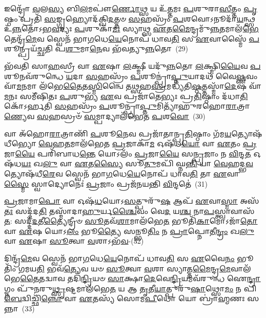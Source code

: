 𑌇𑌨𑍍𑌦𑍍𑌰𑍋᳴ \ul{𑌵}\-𑌲\-\ul{𑌸𑍍𑌯} 𑌬𑌿\-\ul{𑌲}\-𑌮𑌪𑍗॑\-\ul{𑌰𑍍𑌣𑍋}\-𑌥𑍍𑌸 𑌯 𑌉᳴\-\ul{𑌤𑍍𑌤}\-𑌮𑌃 \ul{𑌪}\-𑌶𑍁𑌰𑌾\-\ul{𑌸𑍀}\-𑌤𑍍𑌤𑌂 \ul{𑌪𑍃}\-𑌷𑍍𑌠𑌂 𑌪𑍍𑌰𑌤𑌿᳴ \ul{𑌸}\-𑌙𑍍𑌗𑍃𑌹𑍍𑌯𑍋𑌦᳴𑌕𑍍𑌖𑌿\-\ul{𑌦}\-𑌤𑍍𑌤𑍞 \ul{𑌸}\-𑌹𑌸𑍍𑌰𑌂᳴ \ul{𑌪}\-𑌶𑌵𑍋\-𑌽𑌨𑍂𑌦𑌾᳴\-\ul{𑌯}\-𑌨𑍍𑌥𑍍𑌸 𑌉᳴\-\ul{𑌨𑍍𑌨}\-𑌤𑍋᳴\-𑌽𑌭\-\ul{𑌵}\-𑌦𑍍𑌯𑌃 \ul{𑌪}\-𑌶𑍁𑌕𑌾᳴\-\ul{𑌮𑌃} 𑌸𑍍𑌯𑌾𑌥𑍍𑌸 \ul{𑌏}\-𑌤\-\ul{𑌮𑍈}\-𑌨𑍍𑌦𑍍𑌰𑌮𑍁᳴\-\ul{𑌨𑍍𑌨}\-𑌤𑌮𑌾𑌲᳴\-\ul{𑌭𑍇}\-𑌤𑍇𑌨𑍍𑌦𑍍𑌰᳴\-\ul{𑌮𑍇}\-𑌵 𑌸𑍍𑌵𑍇𑌨᳴ 𑌭𑌾\-\ul{𑌗}\-𑌧𑍇\-\ul{𑌯𑍇}\-𑌨𑍋𑌪᳴ 𑌧𑌾𑌵\-\ul{𑌤𑌿} 𑌸 \ul{𑌏}\-𑌵𑌾𑌸𑍍𑌮𑍈᳴ \ul{𑌪}\-𑌶𑍂𑌨𑍍𑌪𑍍𑌰𑌯᳴𑌚𑍍𑌛𑌤𑌿 𑌪\-\ul{𑌶𑍁}\-𑌮𑌾\-\ul{𑌨𑍇}\-𑌵 𑌭᳴𑌵𑌤𑍍𑌯𑍁\-\ul{𑌨𑍍𑌨}\-𑌤𑍋~(29)

𑌭᳴𑌵𑌤𑌿 𑌸𑌾\-\ul{𑌹}\-𑌸𑍍𑌰𑍀 𑌵𑌾 \ul{𑌏}\-𑌷𑌾 \ul{𑌲}\-𑌕𑍍𑌷𑍍𑌮𑍀 𑌯𑌦𑍁᳴\-\ul{𑌨𑍍𑌨}\-𑌤𑍋 \ul{𑌲}\-𑌕𑍍𑌷𑍍𑌮𑌿\-\ul{𑌯𑍈}\-𑌵 \ul{𑌪}\-𑌶𑍂𑌨𑌵᳴\-𑌰𑍁𑌨𑍍𑌧𑍇 \ul{𑌯}\-𑌦𑌾 \ul{𑌸}\-𑌹𑌸𑍍𑌰𑌂᳴ \ul{𑌪}\-𑌶𑍂𑌨𑍍𑌪𑍍𑌰𑌾॑\-\ul{𑌪𑍍𑌨𑍁}\-𑌯𑌾𑌦𑌥᳴ 𑌵𑍈\-\ul{𑌷𑍍𑌣}\-𑌵𑌂 𑌵𑌾᳴\-\ul{𑌮}\-𑌨𑌮𑌾 𑌲᳴𑌭𑍇\-\ul{𑌤𑍈}\-𑌤\-\ul{𑌸𑍍𑌮𑌿}\-𑌨𑍍𑌵𑍈 𑌤\-\ul{𑌥𑍍𑌸}\-𑌹\-\ul{𑌸𑍍𑌰}\-𑌮𑌦𑍍𑌧𑍍𑌯᳴𑌤𑌿\-\ul{𑌷𑍍𑌠}\-𑌤𑍍𑌤𑌸𑍍𑌮𑌾᳴\-\ul{𑌦𑍇}\-𑌷 𑌵𑌾᳴\-\ul{𑌮}\-𑌨𑌃 𑌸𑌮𑍀᳴𑌷𑌿𑌤𑌃 \ul{𑌪}\-𑌶𑍁𑌭𑍍𑌯᳴ \ul{𑌏}\-𑌵 𑌪𑍍𑌰𑌜𑌾᳴𑌤𑍇𑌭𑍍𑌯𑌃 𑌪𑍍𑌰\-\ul{𑌤𑌿}\-𑌷𑍍𑌠𑌾𑌂 𑌦᳴𑌧𑌾\-\ul{𑌤𑌿} 𑌕𑍋᳴\-𑌽𑌰𑍍\mbox{}𑌹𑌤𑌿 \ul{𑌸}\-𑌹𑌸𑍍𑌰𑌂᳴ \ul{𑌪}\-𑌶𑍂𑌨𑍍𑌪𑍍𑌰𑌾\-\ul{𑌪𑍍𑌤𑍁}\-𑌮𑌿𑌤𑍍𑌯𑌾᳴𑌹𑍁𑌰𑌹𑍋\-\ul{𑌰𑌾}\-𑌤𑍍𑌰𑌾\-\ul{𑌣𑍍𑌯𑍇}\-𑌵 \ul{𑌸}\-𑌹𑌸𑍍𑌰𑍞᳴ \ul{𑌸}\-𑌮𑍍𑌪𑌾𑌦𑍍𑌯𑌾𑌲᳴𑌭𑍇𑌤 \ul{𑌪}\-𑌶\-\ul{𑌵𑍋}\-~(30)

𑌵𑌾 𑌅᳴𑌹𑍋\-\ul{𑌰𑌾}\-𑌤𑍍𑌰𑌾𑌣𑌿᳴ \ul{𑌪}\-𑌶𑍂\-\ul{𑌨𑍇}\-𑌵 𑌪𑍍𑌰𑌜𑌾᳴𑌤𑌾𑌨𑍍𑌪𑍍𑌰\-\ul{𑌤𑌿}\-𑌷𑍍𑌠𑌾𑌂 𑌗᳴𑌮\-\ul{𑌯}\-𑌤𑍍𑌯𑍋𑌷᳴𑌧𑍀𑌭𑍍𑌯𑍋 \ul{𑌵𑍇}\-𑌹\-\ul{𑌤}\-𑌮𑌾𑌲᳴𑌭𑍇𑌤 \ul{𑌪𑍍𑌰}\-𑌜𑌾𑌕𑌾᳴\-\ul{𑌮} 𑌓𑌷᳴𑌧\-\ul{𑌯𑍋} 𑌵𑌾 \ul{𑌏}\-𑌤𑌂 \ul{𑌪𑍍𑌰}\-𑌜𑌾\-\ul{𑌯𑍈} 𑌪𑌰𑌿᳴𑌬𑌾𑌧\-\ul{𑌨𑍍𑌤𑍇} 𑌯𑍋\-𑌽𑌲𑌂᳴ \ul{𑌪𑍍𑌰}\-𑌜𑌾\-\ul{𑌯𑍈} 𑌸\-\ul{𑌨𑍍𑌪𑍍𑌰}\-𑌜𑌾𑌂 𑌨 \ul{𑌵𑌿}\-𑌨𑍍𑌦\-\ul{𑌤} 𑌓𑌷᳴𑌧\-\ul{𑌯𑌃} 𑌖\-\ul{𑌲𑍁} 𑌵𑌾 \ul{𑌏}\-𑌤\-\ul{𑌸𑍍𑌯𑍈} 𑌸𑍂\-\ul{𑌤𑍁}\-𑌮𑌪𑌿᳴ 𑌘𑍍𑌨\-\ul{𑌨𑍍𑌤𑌿} 𑌯𑌾 \ul{𑌵𑍇}\-𑌹𑌦𑍍𑌭\-\ul{𑌵}\-𑌤𑍍𑌯𑍋𑌷᳴𑌧𑍀\-\ul{𑌰𑍇}\-𑌵 𑌸𑍍𑌵𑍇𑌨᳴ 𑌭𑌾\-\ul{𑌗}\-𑌧𑍇\-\ul{𑌯𑍇}\-𑌨𑍋𑌪᳴ 𑌧𑌾𑌵\-\ul{𑌤𑌿} 𑌤𑌾 \ul{𑌏}\-𑌵𑌾\-\ul{𑌸𑍍𑌮𑍈} 𑌸𑍍𑌵𑌾𑌦𑍍𑌯𑍋𑌨𑍇𑌃॑ \ul{𑌪𑍍𑌰}\-𑌜𑌾𑌂 𑌪𑍍𑌰𑌜᳴𑌨𑌯𑌨𑍍𑌤𑌿 \ul{𑌵𑌿}\-𑌨𑍍𑌦𑌤𑍇॑~(31)

\-\ul{𑌪𑍍𑌰}\-𑌜𑌾𑌮𑌾\-\ul{𑌪𑍋} 𑌵𑌾 𑌓𑌷᳴\-\ul{𑌧}\-𑌯𑍋\-𑌽\-\ul{𑌸}\-𑌤𑍍𑌪𑍁𑌰𑍁᳴\-\ul{𑌷} 𑌆𑌪᳴ \ul{𑌏}\-𑌵𑌾\-\ul{𑌸𑍍𑌮𑌾} 𑌅𑌸᳴\-\ul{𑌤𑌃} 𑌸𑌦𑍍𑌦᳴𑌦\-\ul{𑌤𑌿} 𑌤𑌸𑍍𑌮𑌾᳴𑌦𑌾\-\ul{𑌹𑍁}\-𑌰𑍍𑌯\-\ul{𑌶𑍍𑌚𑍈}\-𑌵𑌂 𑌵𑍇\-\ul{𑌦} 𑌯\-\ul{𑌶𑍍𑌚} 𑌨𑌾\-\ul{𑌪}\-𑌸𑍍𑌤𑍍𑌵𑌾𑌵𑌾𑌸᳴\-\ul{𑌤}\-: 𑌸𑌦𑍍𑌦᳴\-\ul{𑌦}\-𑌤𑍀\-\ul{𑌤𑍍𑌯𑍈}\-𑌨𑍍𑌦𑍍𑌰𑍀𑍞 \ul{𑌸𑍂}\-𑌤𑌵᳴\-\ul{𑌶𑌾}\-𑌮𑌾\-𑌲᳴𑌭𑍇\-\ul{𑌤} 𑌭𑍂𑌤𑌿᳴\-\ul{𑌕𑌾}\-𑌮𑍋\-𑌽𑌜𑌾᳴\-\ul{𑌤𑍋} 𑌵𑌾 \ul{𑌏}\-𑌷 𑌯𑍋\-𑌽\-\ul{𑌲𑌂} 𑌭𑍂\-\ul{𑌤𑍍𑌯𑍈} 𑌸𑌨𑍍𑌭𑍂\-\ul{𑌤𑌿𑌂} 𑌨 \ul{𑌪𑍍𑌰𑌾}\-𑌪𑍍𑌨𑍋𑌤𑍀\-\ul{𑌨𑍍𑌦𑍍𑌰𑌂} 𑌖\-\ul{𑌲𑍁} 𑌵𑌾 \ul{𑌏}\-𑌷𑌾 \ul{𑌸𑍂}\-𑌤𑍍𑌵𑌾 \ul{𑌵}\-𑌶𑌾\-𑌽𑌭᳴\-\ul{𑌵}\--(32)

𑌦𑌿𑌨𑍍𑌦𑍍𑌰᳴\-\ul{𑌮𑍇}\-𑌵 𑌸𑍍𑌵𑍇𑌨᳴ 𑌭𑌾\-\ul{𑌗}\-𑌧𑍇\-\ul{𑌯𑍇}\-𑌨𑍋𑌪᳴ 𑌧𑌾𑌵\-\ul{𑌤𑌿} 𑌸 \ul{𑌏}\-𑌵𑍈\-\ul{𑌨𑌂} 𑌭𑍂𑌤𑌿𑌂᳴ 𑌗𑌮𑌯\-\ul{𑌤𑌿} 𑌭𑌵᳴\-\ul{𑌤𑍍𑌯𑍇}\-𑌵 𑌯𑍞 \ul{𑌸𑍂}\-𑌤𑍍𑌵𑌾 \ul{𑌵}\-𑌶𑌾 𑌸𑍍𑌯𑌾𑌤𑍍𑌤\-\ul{𑌮𑍈}\-𑌨𑍍𑌦𑍍𑌰\-\ul{𑌮𑍇}\-𑌵𑌾𑌲᳴𑌭𑍇\-\ul{𑌤𑍈}\-𑌤𑌦𑍍𑌵𑌾𑌵 𑌤𑌦𑌿᳴\-\ul{𑌨𑍍𑌦𑍍𑌰𑌿}\-𑌯𑍞 \ul{𑌸𑌾}\-𑌕𑍍𑌷𑌾\-\ul{𑌦𑍇}\-𑌵𑍇\-\ul{𑌨𑍍𑌦𑍍𑌰𑌿}\-𑌯𑌮𑌵᳴𑌰𑍁𑌨𑍍𑌧 𑌐\-\ul{𑌨𑍍𑌦𑍍𑌰𑌾}\-𑌗𑍍𑌨𑌂 𑌪𑍁᳴𑌨𑌰𑍁\-\ul{𑌥𑍍𑌸𑍃}\-𑌷𑍍𑌟𑌮𑌾\-𑌲᳴𑌭𑍇\-\ul{𑌤} 𑌯 𑌆 \ul{𑌤𑍃}\-𑌤𑍀\-\ul{𑌯𑌾}\-𑌤𑍍𑌪𑍁𑌰𑍁᳴\-\ul{𑌷𑌾}\-𑌥𑍍𑌸𑍋\-\ul{𑌮𑌂} 𑌨 𑌪𑌿\-\ul{𑌬𑍇}\-𑌦𑍍𑌵𑌿𑌚𑍍𑌛𑌿᳴\-\ul{𑌨𑍍𑌨𑍋} 𑌵𑌾 \ul{𑌏}\-𑌤𑌸𑍍𑌯᳴ 𑌸𑍋𑌮\-\ul{𑌪𑍀}\-𑌥𑍋 𑌯𑍋 𑌬𑍍𑌰𑌾॑\-\ul{𑌹𑍍𑌮}\-𑌣𑌃 𑌸𑌨𑍍𑌨𑌾~(33)

